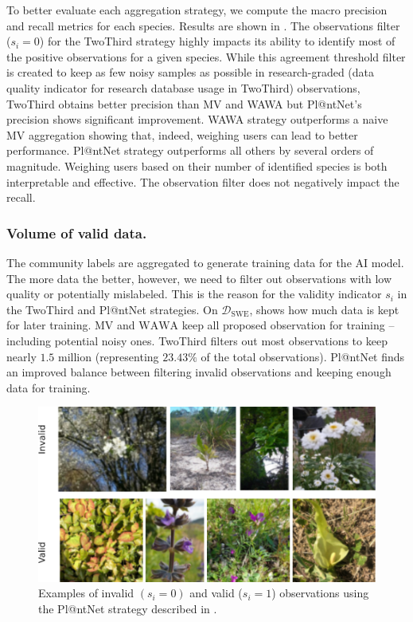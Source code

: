 To better evaluate each aggregation strategy, we compute the macro precision and recall metrics for each species. Results are shown in . The observations filter ($s_i=0$) for the TwoThird strategy highly impacts its ability to identify most of the positive observations for a given species. While this agreement threshold filter is created to keep as few noisy samples as possible in research-graded (data quality indicator for research database usage in TwoThird) observations, TwoThird obtains better precision than MV and WAWA but Pl@ntNet's precision shows significant improvement. WAWA strategy outperforms a naive MV aggregation showing that, indeed, weighing users can lead to better performance. Pl@ntNet strategy outperforms all others by several orders of magnitude. Weighing users based on their number of identified species is both interpretable and effective. The observation filter does not negatively impact the recall.

\subsubsection{Volume of valid data.}

The community labels are aggregated to generate training data for the AI model.
The more data the better, however, we need to filter out observations with low quality or potentially mislabeled.
This is the reason for the validity indicator $s_i$ in the TwoThird and Pl@ntNet strategies.
On $\mathcal{D}_{\mathrm{SWE}}$,  shows how much data is kept for later training.
$\mathrm{MV}$ and $\mathrm{WAWA}$ keep all proposed observation for training -- including potential noisy ones.
TwoThird filters out most observations to keep nearly $1.5$ million (representing $23.43\%$ of the total observations). Pl@ntNet finds an improved balance between filtering invalid observations and keeping enough data for training.

\begin{figure}[htb]
    \centering
    \includegraphics[width=.85\textwidth]{./images_plantnet/valid_and_invalid.pdf}
    \caption{Examples of invalid $(s_i=0)$ and valid ($s_i=1$) observations using the Pl@ntNet strategy described in .}
    \label{fig:valid-invalid-plantnet}
\end{figure}

